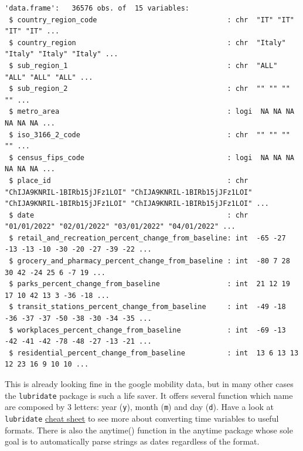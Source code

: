\documentclass[
  letterpaper,
  DIV=11,
  numbers=noendperiod]{scrreprt}
\newenvironment{Shaded}{\begin{snugshade}}{\end{snugshade}}
\newcommand{\CommentTok}[1]{\textcolor[rgb]{0.37,0.37,0.37}{#1}}
\newcommand{\FunctionTok}[1]{\textcolor[rgb]{0.28,0.35,0.67}{#1}}
\newcommand{\NormalTok}[1]{\textcolor[rgb]{0.00,0.23,0.31}{#1}}
\newcommand{\OtherTok}[1]{\textcolor[rgb]{0.00,0.23,0.31}{#1}}
\newcommand{\SpecialCharTok}[1]{\textcolor[rgb]{0.37,0.37,0.37}{#1}}
\begin{document}
\begin{verbatim}
'data.frame':   36576 obs. of  15 variables:
 $ country_region_code                               : chr  "IT" "IT" "IT" "IT" ...
 $ country_region                                    : chr  "Italy" "Italy" "Italy" "Italy" ...
 $ sub_region_1                                      : chr  "ALL" "ALL" "ALL" "ALL" ...
 $ sub_region_2                                      : chr  "" "" "" "" ...
 $ metro_area                                        : logi  NA NA NA NA NA NA ...
 $ iso_3166_2_code                                   : chr  "" "" "" "" ...
 $ census_fips_code                                  : logi  NA NA NA NA NA NA ...
 $ place_id                                          : chr  "ChIJA9KNRIL-1BIRb15jJFz1LOI" "ChIJA9KNRIL-1BIRb15jJFz1LOI" "ChIJA9KNRIL-1BIRb15jJFz1LOI" "ChIJA9KNRIL-1BIRb15jJFz1LOI" ...
 $ date                                              : chr  "01/01/2022" "02/01/2022" "03/01/2022" "04/01/2022" ...
 $ retail_and_recreation_percent_change_from_baseline: int  -65 -27 -13 -13 -10 -30 -20 -27 -39 -22 ...
 $ grocery_and_pharmacy_percent_change_from_baseline : int  -80 7 28 30 42 -24 25 6 -7 19 ...
 $ parks_percent_change_from_baseline                : int  21 12 19 17 10 42 13 3 -36 -18 ...
 $ transit_stations_percent_change_from_baseline     : int  -49 -18 -36 -37 -37 -50 -38 -30 -34 -35 ...
 $ workplaces_percent_change_from_baseline           : int  -69 -13 -42 -41 -42 -78 -48 -27 -13 -21 ...
 $ residential_percent_change_from_baseline          : int  13 6 13 13 12 23 16 9 10 10 ...
\end{verbatim}

This is already looking fine in the google mobility data, but in many
other cases the \texttt{lubridate} package is such a life saver. It
offers several function which name are composed by 3 letters: year
(\texttt{y}), month (\texttt{m}) and day (\texttt{d}). Have a look at
\texttt{lubridate}
\href{https://rawgit.com/rstudio/cheatsheets/main/lubridate.pdf}{cheat
sheet} to see more about converting time variables to useful formats.
There is also the anytime() function in the anytime package whose sole
goal is to automatically parse strings as dates regardless of the
format.

\begin{Shaded}
\end{Shaded}
\end{document}
